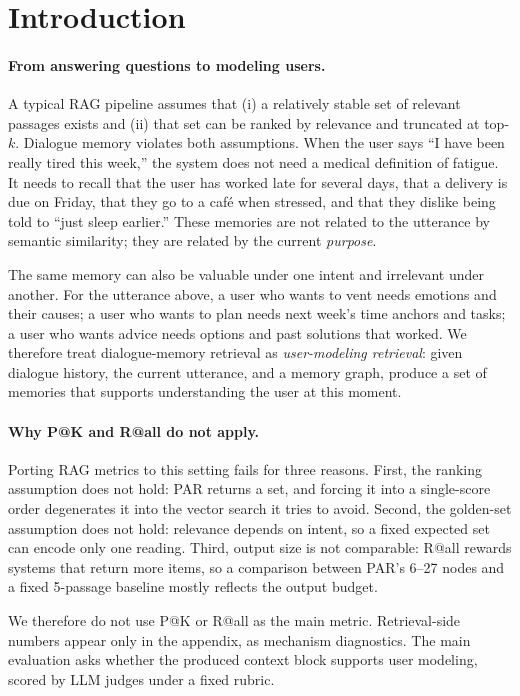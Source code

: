 \documentclass[11pt]{article}
\begin{document}
\section{Introduction}

\paragraph{From answering questions to modeling users.}
A typical RAG pipeline assumes that (i) a relatively stable set of relevant passages exists and
(ii) that set can be ranked by relevance and truncated at top-$k$. Dialogue memory violates
both assumptions. When the user says ``I have been really tired this week,'' the system does
not need a medical definition of fatigue. It needs to recall that the user has worked late for
several days, that a delivery is due on Friday, that they go to a caf\'e when stressed, and
that they dislike being told to ``just sleep earlier.'' These memories are not related to the
utterance by semantic similarity; they are related by the current \emph{purpose}.

The same memory can also be valuable under one intent and irrelevant under another. For the
utterance above, a user who wants to vent needs emotions and their causes; a user who wants to
plan needs next week's time anchors and tasks; a user who wants advice needs options and
past solutions that worked. We therefore treat dialogue-memory retrieval as
\emph{user-modeling retrieval}: given dialogue history, the current utterance, and a memory
graph, produce a set of memories that supports understanding the user at this moment.

\paragraph{Why P@K and R@all do not apply.}
Porting RAG metrics to this setting fails for three reasons. First, the ranking assumption does
not hold: PAR returns a set, and forcing it into a single-score order degenerates it into the
vector search it tries to avoid. Second, the golden-set assumption does not hold: relevance
depends on intent, so a fixed expected set can encode only one reading. Third, output size is
not comparable: R@all rewards systems that return more items, so a comparison between PAR's
6--27 nodes and a fixed 5-passage baseline mostly reflects the output budget.

We therefore do not use P@K or R@all as the main metric. Retrieval-side numbers appear only in
the appendix, as mechanism diagnostics. The main evaluation asks whether the produced context
block supports user modeling, scored by LLM judges under a fixed rubric.
\end{document}

